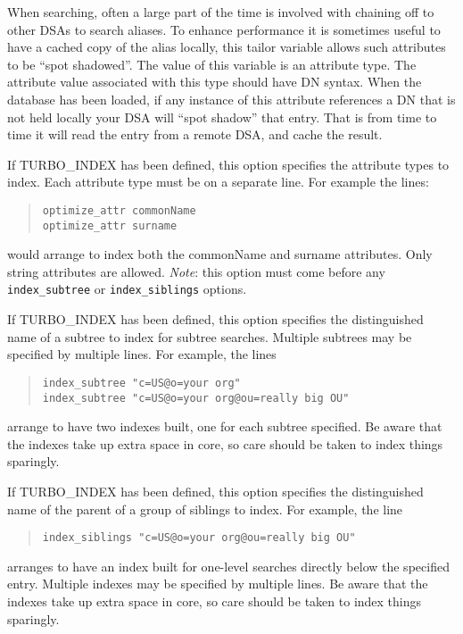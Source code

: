 \begin{describe}
\item [\verb"shadow":]
When searching, often a large part of the
time is involved with chaining off to other DSAs to search aliases.
To enhance performance it
is sometimes useful to have a cached copy of the alias locally, this
tailor variable allows such attributes to be ``spot shadowed''.
The value of this variable is an attribute type.  
The attribute value associated with
this type should have DN syntax.  When the database has been loaded,
if any instance of this attribute references a DN that is not held
locally your DSA will ``spot shadow'' that entry.
That is from time
to time it will read the entry from a remote DSA, and cache the
result.

\item [\verb"optimize\_attr":]
If TURBO\_INDEX has been defined, this option
specifies the attribute types to index.  Each attribute type must
be on a separate line.  For example the lines:
\begin{quote}\begin{verbatim}
optimize_attr commonName
optimize_attr surname
\end{verbatim}\end{quote}
would arrange  to index both the commonName and surname attributes.
Only string attributes are allowed.
{\em Note}: this option must come before any
\verb"index_subtree" or
\verb"index_siblings" options.

\item [\verb"index\_subtree":]
If TURBO\_INDEX has been defined, this option
specifies the distinguished name of a subtree to index for
subtree searches.  Multiple
subtrees may be specified by multiple lines.  For example, the lines
\begin{quote}\begin{verbatim}
index_subtree "c=US@o=your org"
index_subtree "c=US@o=your org@ou=really big OU"
\end{verbatim}\end{quote}
arrange to have two indexes built, one for each subtree specified.  Be
aware that the indexes take up extra space in core, so care should be
taken to index things sparingly.

\item [\verb"index\_siblings":]
If TURBO\_INDEX has been defined, this option
specifies the distinguished name of the parent of a group of
siblings to index.  For example, the line
\begin{quote}\begin{verbatim}
index_siblings "c=US@o=your org@ou=really big OU"
\end{verbatim}\end{quote}
arranges to have an index built for one-level searches directly below
the specified entry.  Multiple indexes may be specified by multiple
lines.  Be aware that the indexes take up extra space in core, so care
should be taken to index things sparingly.


\end{describe}
